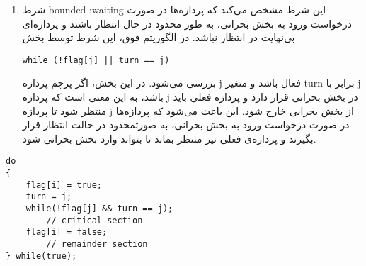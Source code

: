 \begin{qsolve}
\begin{enumerate}
		
		\item شرط bounded :waiting
		 این شرط مشخص می‌کند که پردازه‌ها در صورت درخواست ورود به بخش بحرانی، به طور محدود در حال انتظار باشند و پردازه‌ای بی‌نهایت در انتظار نباشد. در الگوریتم فوق، این شرط توسط بخش 
\begin{latin}
	\texttt{while (!flag[j] || turn == j)}
\end{latin}
بررسی می‌شود. در این بخش، اگر پرچم پردازه j فعال باشد و متغیر turn برابر با j باشد، به این معنی است که پردازه j در بخش بحرانی قرار دارد و پردازه فعلی باید منتظر شود تا پردازه j از بخش بحرانی خارج شود. این باعث می‌شود که پردازه‌ها در صورت درخواست ورود به بخش بحرانی، به صورتمحدود در حالت انتظار قرار بگیرند و پردازه‌ی فعلی نیز منتظر بماند تا بتواند وارد بخش بحرانی شود.\\
	\end{enumerate}
\end{qsolve}


\begin{latin}
\begin{lstlisting}[caption=Code II]
do
{
	flag[i] = true;
	turn = j;
	while(!flag[j] && turn == j);
		// critical section
	flag[i] = false;
		// remainder section
} while(true);
\end{lstlisting}
\end{latin}


